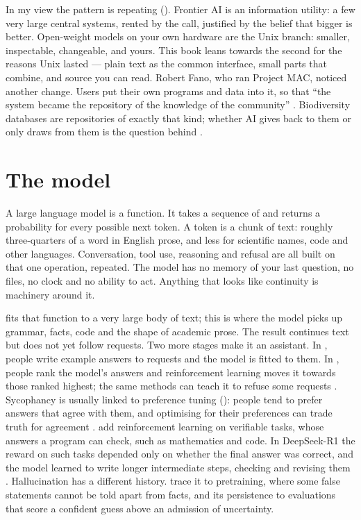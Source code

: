 In my view the pattern is repeating (). Frontier AI is an information
utility: a few very large central systems, rented by the call, justified by the
belief that bigger is better. Open-weight models on your own hardware are the
Unix branch: smaller, inspectable, changeable, and yours. This book leans
towards the second for the reasons Unix lasted --- plain text as the common
interface, small parts that combine, and source you can read. Robert Fano,
who ran Project MAC, noticed another change. Users put their own programs
and data into it, so that ``the system became the
repository of the knowledge of the community''
\parencite{waldrop2002dreammachine}. Biodiversity databases are repositories of
exactly that kind; whether AI gives back to them or only draws from them is the
question behind .

\section{The model}

A large language model is a function. It takes a sequence of 
and returns a probability for every possible next token. A token is a chunk of
text: roughly three-quarters of a word in English prose, and less for
scientific names, code and other languages. Conversation, tool use, reasoning and
refusal are all built on that one operation, repeated. The model has no memory
of your last question, no files, no clock and no ability to act. Anything that
looks like continuity is machinery around it.

 fits that function to a very large body of text; this is
where the model picks up grammar, facts, code and the shape of academic prose.
The result continues text but does not yet follow requests. Two more stages
make it an assistant. In , people write example
answers to requests and the model is fitted to them. In , people rank the model's answers and reinforcement learning moves it
towards those ranked highest; the same methods can teach it to refuse some
requests \parencite{ouyang2022instructgpt}. Sycophancy is usually linked to
preference tuning (): people tend to prefer answers that agree
with them, and optimising for their preferences can trade truth for agreement
\parencite{sharma2024sycophancy}.  add reinforcement
learning on verifiable tasks, whose answers a program can check, such as
mathematics and code. In DeepSeek-R1 the reward on
such tasks depended only on whether the final answer was correct, and the model
learned to write longer intermediate steps, checking and revising them
\parencite{guo2025deepseekr1}. Hallucination has a different
history. \textcite{kalai2025hallucinate} trace it to pretraining, where some
false statements cannot be told apart from facts, and its persistence to
evaluations that score a confident guess above an admission of uncertainty.

